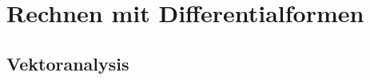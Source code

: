%

\section{Rechnen mit Differentialformen}
\addtocounter{thmn}{1}
\setcounter{theorem}{0}




\subsection{Vektoranalysis}


